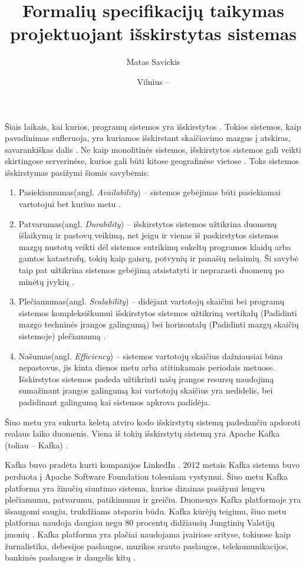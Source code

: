 \documentclass{VUMIFPSmagistrinis}
\title{Formalių specifikacijų taikymas projektuojant išskirstytas sistemas}
\author{Matas Savickis}
\date{Vilnius – \the\year}
\begin{document}
\maketitle

\tableofcontents


		Šiais laikais, kai kurios, programų sistemos yra išskirstytos \cite{mcr}. 
		Tokios sistemos, kaip pavadinimas sufleruoja, yra kuriamos išskirstant skaičiavimo mazgus į atskiras, savarankiškas dalis \cite{coulouris2005distributed}.
		Ne kaip monolitinės sistemos, išskirstytos sistemos gali veikti skirtingose serverinėse, kurios gali būti kitose geografinėse vietose \cite{shirriff2006method} .
		Toks sistemos išskirstymas pasižymi šiomis savybėmis:
		\begin{enumerate}
			\item{Pasiekiamumas(angl. {\it Availability}) -- sistemos gebėjimas būti pasiekiamai vartotojui bet kuriuo metu \cite{180327} .}
			\item{Patvarumas(angl. {\it Durability}) -- išskirstytos sistemos užtikrina duomenų išlaikymą ir pastovų veikimą, net jeigu ir vienas iš paskirstytos sistemos mazgų nustotų veikti dėl sistemos sutrikimų sukeltų programos klaidų arba gamtos katastrofų, tokių kaip gaisrų, potvynių ir panašių nelaimių. Ši savybė taip pat užtikrina sistemos gebėjimą atsistatyti ir neprarasti duomenų po minėtų įvykių \cite{5470366}.}
			\item{Plečiamumas(angl. {\it Scalability}) -- didėjant vartotojų skaičiui bei programų sistemos kompleksiškumui išskirstytos sistemos užtikriną vertikalų (Padidinti mazgo techninės įrangos galingumą) bei horizontalų (Padidinti mazgų skaičių sistemoje) plečiamumą \cite{862209}.}
			\item{Našumas(angl. {\it Efficiency}) -- sistemos vartotojų skaičius dažniausiai būna nepastovus, jis kinta dienos metu arba atitinkamais periodais metuose. Išskirstytos sistemos padeda užtikrinti našų įrangos resursų naudojimą sumažinant įrangos galingumą kai vartotojų skaičius yra nedidelis, bei padidinant galingumą kai sistemos apkrova padidėja.}
		\end{enumerate}
		Šiuo metu yra sukurta keletą atviro kodo išskirstytų sistemų padedančiu apdoroti realaus laiko duomenis.	
		Viena iš tokių išskirstytų sistemų yra Apache Kafka (toliau -- Kafka) \cite{kfk}.


 		Kafka buvo pradėta kurti kompanijos LinkedIn \cite{kfk}.
		2012 metais Kafka sistema buvo perduota į Apache Software Foundation tolesniam vystymui.
		Šiuo metu Kafka platforma yra žinučių siuntimo sistema, kurios dizainas pasižymi lengvu plečiamumu, patvarumu, patikimumu ir greičiu.
		Duomenys Kafka platformoje yra išsaugomi saugiu, trukdžiams atspariu būdu.
		Kafka kūrėjų teigimu, šiuo metu platforma naudoja daugiau negu 80 procentų didžiausių Jungtinių Valstijų įmonių \cite{kfk}.
		Kafka platforma yra plačiai naudojama įvairiose srityse, tokiuose kaip žurnalistika, debesijos paslaugos, muzikos srauto paslaugos, telekomunikacijos, bankinės paslaugos ir daugelis kitų \cite{kfk}.
\end{document}
